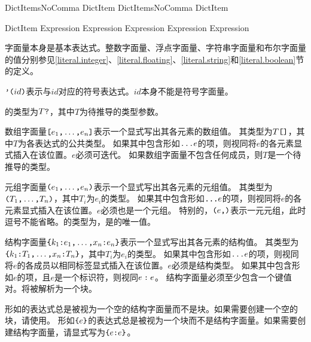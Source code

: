 \begin{bnf}{DictItemsNoComma}
    DictItem \br
    DictItemsNoComma \terminal{,} DictItem
\end{bnf}

\begin{bnf}{DictItem}
    Expression \terminal{:} Expression \br
     Expression \br
     Expression \terminal{:}  Expression
\end{bnf}

\pnum
字面量本身是基本表达式。整数字面量、浮点字面量、字符串字面量和布尔字面量的值分别参见\ref{literal.integer}、\ref{literal.floating}、\ref{literal.string}和\ref{literal.boolean}节的定义。

\pnum
$\texttt{'(}id\texttt{)}$表示与$id$对应的符号表达式。$id$本身不能是符号字面量。

\pnum
{}的类型为$T\texttt{?}$，其中$T$为待推导的类型参数。

\pnum
数组字面量$\texttt{[}e_1\texttt{,}\ldots\texttt{,}e_n\texttt{]}$表示一个显式写出其各元素的数组值。
其类型为$T\texttt{[]}$，其中$T$为各表达式的公共类型。
如果其中包含形如$\texttt{...}e$的项，则视同将$e$的各元素显式插入在该位置。$e$必须可迭代。
如果数组字面量不包含任何成员，则$T$是一个待推导的类型。

\pnum
元组字面量$\texttt{(}e_1\texttt{,}\ldots\texttt{,}e_n\texttt{)}$表示一个显式写出其各元素的元组值。
其类型为$\texttt{(}T_1\texttt{,}\ldots\texttt{,}T_n\texttt{)}$，其中$T_i$为$e_i$的类型。
如果其中包含形如$\texttt{...}e$的项，则视同将$e$的各元素显式插入在该位置。$e$必须也是一个元组。
特别的，$\texttt{(}e\texttt{,)}$表示一元元组，此时逗号不能省略。\tcode{()}的类型为，是的唯一值。

\pnum
结构字面量$\texttt{\{}k_1\texttt{:}e_1\texttt{,}\ldots\texttt{,}x_n\texttt{:}e_n\texttt{\}}$表示一个显式写出其各元素的结构值。
其类型为$\texttt{\{}k_1\texttt{:}T_1\texttt{,}\ldots\texttt{,}x_n\texttt{:}T_n\texttt{\}}$，其中$T_i$为$e_i$的类型。
如果其中包含形如$\texttt{...}e$的项，则视同将$e$的各成员以相同标签显式插入在该位置。$e$必须是结构类型。
如果其中包含形如$e$的项，且$e$是一个标识符，则视同$e\mathbin{\texttt{:}}e$。
\enternote 结构字面量必须至少包含一个键值对。\tcode{\{\}}将被解析为一个块。\exitnote

\pnum
形如\tcode{\{\}}的表达式总是被视为一个空的结构字面量而不是块。\enternote 如果需要创建一个空的块，请使用。\exitnote
形如$\texttt{\{}e\texttt{\}}$的表达式总是被视为一个块而不是结构字面量。\enternote 如果需要创建结构字面量，请显式写为$\texttt{\{}e\texttt{:}e\texttt{\}}$。\exitnote

